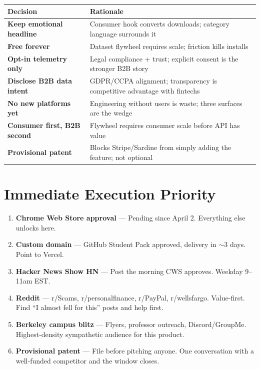 \documentclass[12pt, letterpaper]{article}
\begin{document}
\begin{tabularx}{\linewidth}{>{\bfseries}lX}
\toprule
Decision & Rationale \\
\midrule
Keep emotional headline & Consumer hook converts downloads; category language surrounds it \\
Free forever & Dataset flywheel requires scale; friction kills installs \\
Opt-in telemetry only & Legal compliance + trust; explicit consent is the stronger B2B story \\
Disclose B2B data intent & GDPR/CCPA alignment; transparency is competitive advantage with fintechs \\
No new platforms yet & Engineering without users is waste; three surfaces are the wedge \\
Consumer first, B2B second & Flywheel requires consumer scale before API has value \\
Provisional patent & Blocks Stripe/Sardine from simply adding the feature; not optional \\
\bottomrule
\end{tabularx}

\section{Immediate Execution Priority}

\begin{enumerate}[leftmargin=1.5em, itemsep=0.4em]
  \item \textbf{Chrome Web Store approval} --- Pending since April 2. Everything else unlocks here.
  \item \textbf{Custom domain} --- GitHub Student Pack approved, delivery in $\sim$3 days. Point to Vercel.
  \item \textbf{Hacker News Show HN} --- Post the morning CWS approves. Weekday 9--11am EST.
  \item \textbf{Reddit} --- r/Scams, r/personalfinance, r/PayPal, r/wellsfargo. Value-first. Find ``I almost fell for this'' posts and help first.
  \item \textbf{Berkeley campus blitz} --- Flyers, professor outreach, Discord/GroupMe. Highest-density sympathetic audience for this product.
  \item \textbf{Provisional patent} --- File before pitching anyone. One conversation with a well-funded competitor and the window closes.
\end{enumerate}
\end{document}
